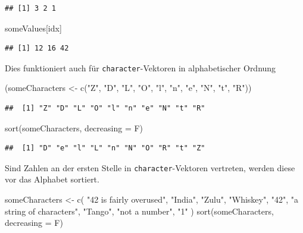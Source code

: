 \documentclass[
]{book}
\newenvironment{Shaded}{\begin{snugshade}}{\end{snugshade}}
\newcommand{\AttributeTok}[1]{\textcolor[rgb]{0.77,0.63,0.00}{#1}}
\newcommand{\FunctionTok}[1]{\textcolor[rgb]{0.00,0.00,0.00}{#1}}
\newcommand{\NormalTok}[1]{#1}
\newcommand{\OtherTok}[1]{\textcolor[rgb]{0.56,0.35,0.01}{#1}}
\newcommand{\StringTok}[1]{\textcolor[rgb]{0.31,0.60,0.02}{#1}}
\begin{document}
\begin{verbatim}
## [1] 3 2 1
\end{verbatim}

\begin{Shaded}
\begin{Highlighting}[]
\NormalTok{someValues[idx]}
\end{Highlighting}
\end{Shaded}

\begin{verbatim}
## [1] 12 16 42
\end{verbatim}

Dies funktioniert auch für \texttt{character}-Vektoren in alphabetischer Ordnung

\begin{Shaded}
\begin{Highlighting}[]
\NormalTok{(someCharacters }\OtherTok{\textless{}{-}}  \FunctionTok{c}\NormalTok{(}\StringTok{"Z"}\NormalTok{, }\StringTok{"D"}\NormalTok{, }\StringTok{"L"}\NormalTok{, }\StringTok{"O"}\NormalTok{, }\StringTok{"l"}\NormalTok{, }\StringTok{"n"}\NormalTok{, }\StringTok{"e"}\NormalTok{, }\StringTok{"N"}\NormalTok{, }\StringTok{"t"}\NormalTok{, }\StringTok{"R"}\NormalTok{))}
\end{Highlighting}
\end{Shaded}

\begin{verbatim}
##  [1] "Z" "D" "L" "O" "l" "n" "e" "N" "t" "R"
\end{verbatim}

\begin{Shaded}
\begin{Highlighting}[]
\FunctionTok{sort}\NormalTok{(someCharacters, }\AttributeTok{decreasing =}\NormalTok{ F)}
\end{Highlighting}
\end{Shaded}

\begin{verbatim}
##  [1] "D" "e" "l" "L" "n" "N" "O" "R" "t" "Z"
\end{verbatim}

\small

Sind Zahlen an der ersten Stelle in \texttt{character}-Vektoren vertreten, werden diese vor das Alphabet sortiert.

\begin{Shaded}
\begin{Highlighting}[]
\NormalTok{someCharacters }\OtherTok{\textless{}{-}} \FunctionTok{c}\NormalTok{(}
  \StringTok{"42 is fairly overused"}\NormalTok{,}
  \StringTok{"India"}\NormalTok{,}
  \StringTok{"Zulu"}\NormalTok{,}
  \StringTok{"Whiskey"}\NormalTok{,}
  \StringTok{"42"}\NormalTok{,}
  \StringTok{"a string of characters"}\NormalTok{,}
  \StringTok{"Tango"}\NormalTok{,}
  \StringTok{"not a number"}\NormalTok{,}
  \StringTok{"1"}
\NormalTok{)}
\FunctionTok{sort}\NormalTok{(someCharacters, }\AttributeTok{decreasing =}\NormalTok{ F)}
\end{Highlighting}
\end{Shaded}
\end{document}
